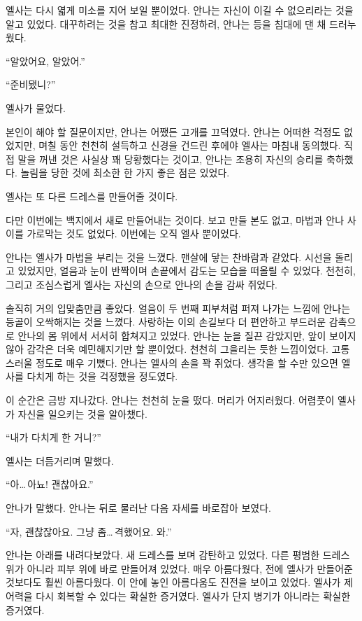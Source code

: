 엘사는 다시 엷게 미소를 지어 보일 뿐이었다. 안나는 자신이 이길 수 없으리라는 것을 알고 있었다. 대꾸하려는 것을 참고 최대한 진정하려, 안나는 등을 침대에 댄 채 드러누웠다.

``알았어요, 알았어.''

``준비됐니?''

엘사가 물었다.

본인이 해야 할 질문이지만, 안나는 어쨌든 고개를 끄덕였다. 안나는 어떠한 걱정도 없었지만, 며칠 동안 천천히 설득하고 신경을 건드린 후에야 엘사는 마침내 동의했다. 직접 말을 꺼낸 것은 사실상 꽤 당황했다는 것이고, 안나는 조용히 자신의 승리를 축하했다. 놀림을 당한 것에 최소한 한 가지 좋은 점은 있었다.

엘사는 또 다른 드레스를 만들어줄 것이다.

다만 이번에는 백지에서 새로 만들어내는 것이다. 보고 만들 본도 없고, 마법과 안나 사이를 가로막는 것도 없었다. 이번에는 오직 엘사 뿐이었다.

안나는 엘사가 마법을 부리는 것을 느꼈다. 맨살에 닿는 찬바람과 같았다. 시선을 돌리고 있었지만, 얼음과 눈이 반짝이며 손끝에서 감도는 모습을 떠올릴 수 있었다. 천천히, 그리고 조심스럽게 엘사는 자신의 손으로 안나의 손을 감싸 쥐었다.

솔직히 거의 입맞춤만큼 좋았다. 얼음이 두 번째 피부처럼 퍼져 나가는 느낌에 안나는 등골이 오싹해지는 것을 느꼈다. 사랑하는 이의 손길보다 더 편안하고 부드러운 감촉으로 안나의 몸 위에서 서서히 합쳐지고 있었다. 안나는 눈을 질끈 감았지만, 앞이 보이지 않아 감각은 더욱 예민해지기만 할 뿐이었다. 천천히 그을리는 듯한 느낌이었다. 고통스러울 정도로 매우 기뻤다. 안나는 엘사의 손을 꽉 쥐었다. 생각을 할 수만 있으면 엘사를 다치게 하는 것을 걱정했을 정도였다.

이 순간은 금방 지나갔다. 안나는 천천히 눈을 떴다. 머리가 어지러웠다. 어렴풋이 엘사가 자신을 일으키는 것을 알아챘다.

``내가 다치게 한 거니?''

엘사는 더듬거리며 말했다.

``아\ldots\,아뇨! 괜찮아요.''

안나가 말했다. 안나는 뒤로 물러난 다음 자세를 바로잡아 보였다.

``자, 괜찮잖아요. 그냥 좀\ldots\,격했어요. 와.''

안나는 아래를 내려다보았다. 새 드레스를 보며 감탄하고 있었다. 다른 평범한 드레스 위가 아니라 피부 위에 바로 만들어져 있었다. 매우 아름다웠다, 전에 엘사가 만들어준 것보다도 훨씬 아름다웠다. 이 안에 놓인 아름다움도 진전을 보이고 있었다. 엘사가 제어력을 다시 회복할 수 있다는 확실한 증거였다. 엘사가 단지 병기가 아니라는 확실한 증거였다.

